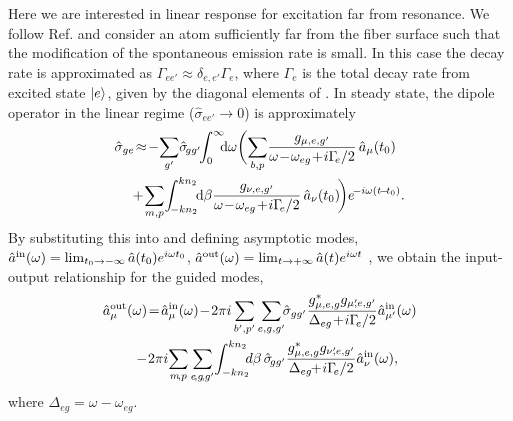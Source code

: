 \documentclass[aps,pra,twocolumn]{revtex4-1} %
\newcommand{\inp}{{\rm in}}
\newcommand{\out}{{\rm out}}
\begin{document}
Here we are interested in linear response for excitation far from resonance. We follow Ref. \cite{le_kien_propagation_2014} and consider an atom sufficiently far from the fiber surface such that the modification of the spontaneous emission rate is small.   In this case the decay rate is approximated as $\Gamma_{ee'} \approx \delta_{e,e'} \Gamma_{e}$, where $\Gamma_e$ is the total decay rate from excited state $\lvert{e}\rangle$, given by the diagonal elements of .  In steady state, the dipole operator in the linear regime ($\hat{\sigma}_{ee'} \rightarrow 0 $) is approximately
	\begin{align}
		\hat{\sigma}_{ge} &\!\approx\!  -\!\sum_{g'}\! \hat{\sigma}\!_{gg'}\!\!\int_0^{\infty}\!\!\!\mathrm{d}\omega \bigg(\!  \sum_{b,p}\!  
\frac{g_{\mu, e,g'}}{\omega\!-\!\omega_{eg} \!+\! i \Gamma\!_{e}/2  }\, \hat{a}_\mu (t_0) \nn\\
	&\!\! +\!\sum_{m,p}\! \int_{\!-kn_2}^{kn_2}\!\!\mathrm{d}\beta  \frac{g_{\nu, e,g'}}{\omega\!-\!\omega_{eg} \!+\! i \Gamma\!_{e}/2 } \,\hat{a}_\nu (t_0)  \!\bigg)e^{\!-i\omega (t\!-\!t_0)} . 
	\end{align}
By substituting this into  and defining asymptotic modes, $\hat{a}^{\inp}(\omega) = \lim_{t_0\rightarrow -\infty} \hat{a}(t_0) e^{i\omega t_0}$, $\hat{a}^{\out}(\omega) = \lim_{t\rightarrow +\infty} \hat{a}(t) e^{i\omega t}$ \cite{fan_input-output_2010}, we obtain the input-output relationship for the guided modes,
	\begin{align} \label{Eq::aout}
		\hat{a}^{\out}_\mu (\omega) &\!=\! \hat{a}^{\inp}_\mu (\omega) \!-\! 2\pi i\sum_{b',p'} 
\sum_{e,g,g'}\!\!\hat{\sigma}_{gg'}\frac{ g_{\mu,e,g}^* g_{\mu'\!\!,e,g'}}{ \Delta_{eg} \!+\! i \Gamma\!_{e}/2 }\hat{a}^{\inp}_{\mu'}(\omega) \nn\\
&\!\!\!\!\!\!-\! 2\pi i\!\sum_{m\!,p} \sum_{e\!,g\!,g'}\! \int^{kn_2}_{-kn_2}\!\!\! d\beta \,\hat{\sigma}\!_{gg'}\frac{ g_{\mu,e,g}^* g_{\nu'\!\!,e,g'}}{ \Delta_{eg} \!\!+\! i \Gamma\!_{e}/2 }\hat{a}^{\inp}_{\nu}(\omega),
	\end{align}
where $\Delta_{eg} = \omega - \omega_{eg}$. 
\end{document}
